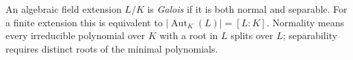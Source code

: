 
An algebraic field extension $L/K$ is \emph{Galois} if it is both normal and separable. For a finite extension this is equivalent to $|\operatorname{Aut}_K(L)|=[L:K]$. Normality means every irreducible polynomial over $K$ with a root in $L$ splits over $L$; separability requires distinct roots of the minimal polynomials.
